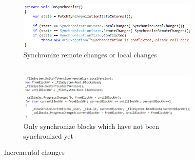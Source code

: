 \documentclass[JCDReport.tex]{subfiles}
\begin{document}
\begin{figure}[h!]
	\begin{subfigure}[b]{1\textwidth}
		\centering
		\includegraphics[scale=1]{Images/do_synchronization.png} 
		\caption{Synchronize remote changes or local changes\\\ \\} %
	\end{subfigure}
	
	\begin{subfigure}[b]{1\textwidth}
		\centering
		\includegraphics[scale=1]{Images/incremental_changes.png}
		\caption{Only synchronize blocks which have not been synchronized yet}
	\end{subfigure}
	\caption{Incremental changes}
\end{figure}



\end{document}
